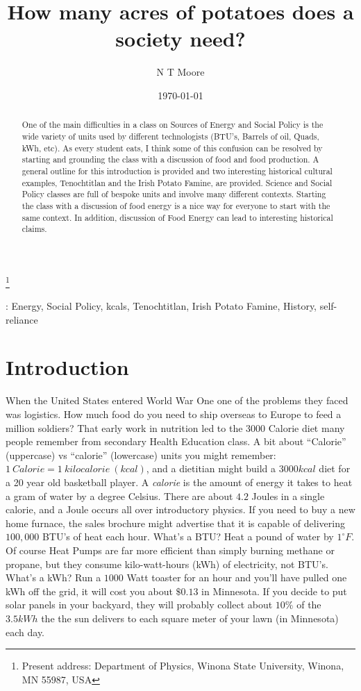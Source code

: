 \documentclass[12pt]{iopart}
\begin{document}
\title[How many acres of potatoes does a society need?]{How many acres of potatoes does a society need?}
\author{N T Moore}
\footnote{Present address:
Department of Physics, Winona State University, Winona, MN 55987, USA}
\date{\today}
\begin{abstract}
One of the main difficulties in a class on Sources of Energy and Social Policy is the wide variety of units used by different technologists (BTU's, Barrels of oil, Quads, kWh, etc).  As every student eats, I think some of this confusion can be resolved by starting and grounding the class with a discussion of food and food production.  A general outline for this introduction is provided and two interesting historical cultural examples, Tenochtitlan and the Irish Potato Famine, are provided.  
Science and Social Policy classes are full of bespoke units and involve many different contexts.  Starting the class with a discussion of food energy is a nice way for everyone to start with the same context.  In addition, discussion of Food Energy can lead to interesting historical claims. 
\end{abstract}
: Energy, Social Policy, kcals, Tenochtitlan, Irish Potato Famine, History, self-reliance
\maketitle

\section{Introduction}
When the United States entered World War One one of the problems they faced was logistics.  How much food do you need to ship overseas to Europe to feed a million soldiers?  That early work in nutrition led to the $3000$ Calorie diet many people remember from secondary Health Education class.  A bit about ``Calorie'' (uppercase) vs ``calorie'' (lowercase) units you might remember: $1~Calorie = 1~kilocalorie~(kcal)$, and a dietitian might build a $3000 kcal$ diet for a 20 year old basketball player.  A \textit{calorie} is the amount of energy it takes  to heat a gram of water by a degree Celsius.  There are about $4.2$ Joules in a single calorie, and a Joule occurs all over introductory  physics.  If you need to buy a new home furnace, the sales brochure might advertise that it is capable of delivering $100,000$ BTU's of heat each hour.  What's a BTU? Heat a pound of water by $1^{\circ}F$.  Of course Heat Pumps are far more efficient than simply burning methane or propane, but they consume kilo-watt-hours (kWh) of electricity, not BTU's.  What's a kWh?  Run a $1000$ Watt toaster for an hour and you'll have pulled one kWh off the grid, it will cost you about $\$0.13$ in Minnesota.  If you decide to put solar panels in your backyard, they will probably collect about $10\%$ of the $3.5kWh$ the  the sun delivers to each square meter of your lawn (in Minnesota) each day.  
\end{document}
